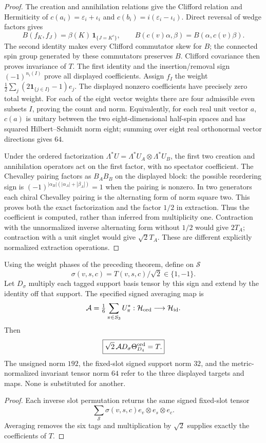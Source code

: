 \documentclass[11pt]{article}
\begin{document}
\begin{proof}
The creation and annihilation relations give the Clifford relation and
Hermiticity of \(c(a_i)=\varepsilon_i+\iota_i\) and
\(c(b_i)=i(\varepsilon_i-\iota_i)\).
Direct reversal of wedge factors gives
\[
 B(f_K,f_J)=\beta(K)\,\mathbf1_{\{J=K^c\}},\qquad
 B(c(v)\alpha,\beta)=B(\alpha,c(v)\beta).
\]
The second identity makes every Clifford commutator skew for \(B\);
the connected spin group generated by these commutators preserves \(B\).
Clifford covariance then proves invariance of \(T\).
The first identity and the insertion/removal sign
\((-1)^{n_i(I)}\) prove all displayed coefficients.
Assign \(f_I\) the weight
\(\frac12\sum_j(2\mathbf1_{\{j\in I\}}-1)e_j\).
The displayed nonzero coefficients have precisely zero total weight.
For each of the eight vector weights there are four admissible even
subsets \(I\), proving the count and norm. Equivalently, for each real
unit vector \(a\), \(c(a)\) is unitary between the two eight-dimensional
half-spin spaces and has squared Hilbert--Schmidt norm eight; summing
over eight real orthonormal vector directions gives \(64\).

Under the ordered factorization
\(\Lambda^*U=\Lambda^*U_A\otimes\Lambda^*U_B\), the first two creation
and annihilation operators act on the first factor, with no spectator
coefficient. The Chevalley pairing factors as \(B_A B_B\) on the
displayed block: the possible reordering sign is
\((-1)^{|\alpha_B|(|\alpha_A|+|\beta_A|)}=1\) when the pairing is
nonzero. In two generators each chiral Chevalley pairing is the
alternating form of norm square two. This proves both the exact
factorization and the factor \(1/2\) in extraction.
Thus the coefficient is computed, rather than inferred from
multiplicity one. Contraction with the unnormalized inverse
alternating form without \(1/2\) would give \(2T_A\);
contraction with a unit singlet would give \(\sqrt2T_A\).
These are different explicitly normalized extraction operations.
\end{proof}

\begin{corollary}
\label{p1:cor:v214-tagged-signed-triality-projection}
Using the weight phases of the preceding theorem, define on
\(\mathcal S\)
\[
 \sigma(v,s,c)=T(v,s,c)/\sqrt2\in\{1,-1\}.
\]
Let \(D_\sigma\) multiply each tagged support basis tensor by this
sign and extend by the identity off that support. The specified signed
averaging map is
\[
 \mathcal A=\tfrac16\sum_{\pi\in S_3}U_\pi^*:
 \mathcal H_{\rm ord}\longrightarrow\mathcal H_{\rm id}.
\]
Then
\[
 \boxed{\sqrt2\,\mathcal A D_\sigma\Theta_{D_4}^{\rm ord}=T.}
\]
The unsigned norm \(192\), the fixed-slot signed support norm \(32\),
and the metric-normalized invariant tensor norm \(64\) refer to the
three displayed targets and maps. None is substituted for another.
\end{corollary}
\begin{proof}
Each inverse slot permutation returns the same signed fixed-slot tensor
\[
 \sum_{\mathcal S}\sigma(v,s,c)e_v\otimes e_s\otimes e_c.
\]
Averaging removes the six tags and multiplication by
\(\sqrt2\) supplies exactly the coefficients of \(T\).
\end{proof}
\end{document}
